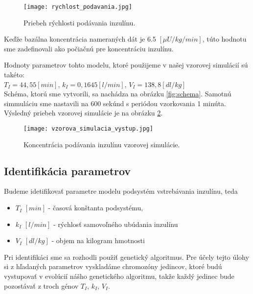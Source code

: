 \documentclass[11pt]{article} %
\begin{document}
\begin{figure}[h] 
	\centering
	\texttt{[image: rychlost\_podavania.jpg]} 
	\caption{Priebeh rýchlosti podávania inzulínu.}
	\label{fig:v_podavania_I}
\end{figure}

Keďže bazálna koncentrácia nameraných dát je 6.5 $[\mu U/kg/min]$, túto hodnotu sme zadefinovali ako počiačnú pre koncentráciu inzulínu.

Hodnoty parametrov tohto modelu, ktoré použijeme v našej vzorovej simulácií sú takéto:
\\

$T_I = 44,55 [min] $, \hspace{5mm}
$k_I = 0,1645 [l/min]$, \hspace{5mm}
$V_I = 138,8 [dl/kg]$
\\

Schéma, ktorú sme vytvorili, sa nachádza na obrázku \ref{fig:schema}. Samotnú simmuláciu sme nastavili na 600 sekúnd s periódou vzorkovania 1 minúta. Výsledný priebeh vzorovej simulácie je na obrázku \ref{fig:sim_vystup}.


\begin{figure}[h]
	\centering
	\texttt{[image: vzorova\_simulacia\_vystup.jpg]} 
	\caption{Koncentrácia podávania inzulínu vzorovej simulácie.}
	\label{fig:sim_vystup}
\end{figure}

\newpage
\subsection{Identifikácia parametrov} \label{subsec:ids1}
Budeme idetifikovať parametre modelu podsystém vstrebávania inzulínu, teda
\begin{itemize}
\item $T_I$ $[min]$ - časová konštanta podsystému,
\item $k_I$ $[l/min]$ - rýchlosť samovoľného ubúdania inzulínu
\item $V_I$ $[dl/kg]$ - objem na kilogram hmotnosti
\end{itemize}

Pri identifikáci sme sa rozhodli použiť genetický algoritmus. Pre účely tejto úlohy si z hľadaných parametrov vyskladáme chromozóny jedincov, ktoré budú vystupovať v evolúcií nášho genetického algoritmu, takže každý jedinec bude pozostávať z troch génov $T_I$, $k_I$, $V_I$. 
\end{document}
